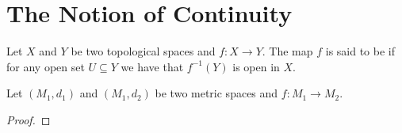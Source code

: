 \section{The Notion of Continuity}

\begin{definition}
	Let $X$ and $Y$ be two topological spaces and $f: X \to Y$. The map $f$ is said to be  if for any open set $U \subseteq Y$ we have that $f^{-1}(Y)$ is open in $X$.
\end{definition}

\begin{proposition}
	Let $(M_1,d_1)$ and $(M_1,d_2)$ be two metric spaces and $f: M_1 \to M_2$.
\end{proposition}

\begin{proof}
	
\end{proof}
